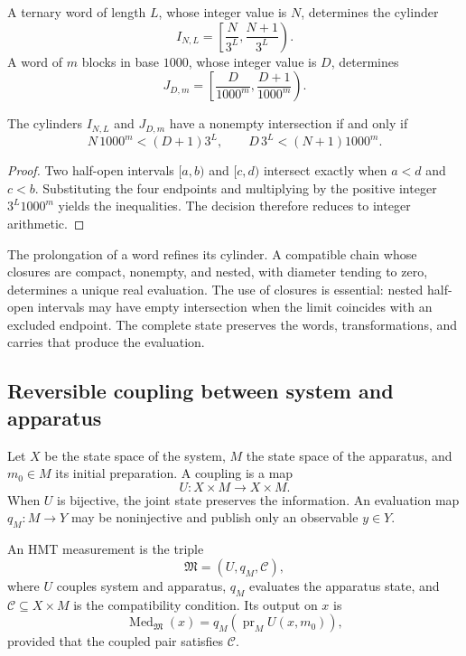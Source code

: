 A ternary word of length \(L\), whose integer value is \(N\), determines
the cylinder
\[
 I_{N,L}=\left[\frac{N}{3^L},\frac{N+1}{3^L}\right).
\]
A word of \(m\) blocks in base \(1000\), whose integer value is \(D\),
determines
\[
 J_{D,m}=\left[\frac{D}{1000^m},\frac{D+1}{1000^m}\right).
\]

\begin{lemma}
The cylinders \(I_{N,L}\) and \(J_{D,m}\) have a nonempty intersection if and
only if
\[
 N\,1000^m<(D+1)3^L,
 \qquad
 D\,3^L<(N+1)1000^m.
\]
\end{lemma}
\begin{proof}
Two half-open intervals \([a,b)\) and \([c,d)\) intersect exactly
when \(a<d\) and \(c<b\). Substituting the four endpoints and multiplying
by the positive integer \(3^L1000^m\) yields the inequalities. The
decision therefore reduces to integer arithmetic.
\end{proof}

The prolongation of a word refines its cylinder. A compatible chain whose closures are compact, nonempty, and nested, with diameter tending to zero, determines a unique real evaluation. The use of closures is essential: nested half-open intervals may have empty intersection when the limit coincides with an excluded endpoint. The complete state preserves the words, transformations, and carries that produce the evaluation.

\subsection{Reversible coupling between system and apparatus}

Let \(X\) be the state space of the system, \(M\) the state space of the
apparatus, and \(m_0\in M\) its initial preparation. A coupling is a
map
\[
 U:X\times M\longrightarrow X\times M.
\]
When \(U\) is bijective, the joint state preserves the information.
An evaluation map \(q_M:M\to Y\) may be noninjective and publish only an
observable \(y\in Y\).

\begin{definition}[Measurement]
An HMT measurement is the triple
\[
 \mathfrak M=(U,q_M,\mathcal C),
\]
where \(U\) couples system and apparatus, \(q_M\) evaluates the
apparatus state, and \(\mathcal C\subseteq X\times M\) is the compatibility condition. Its output
on \(x\) is
\[
 \operatorname{Med}_{\mathfrak M}(x)
 =q_M\!\left(\operatorname{pr}_M U(x,m_0)\right),
\]
provided that the coupled pair satisfies \(\mathcal C\).
\end{definition}

